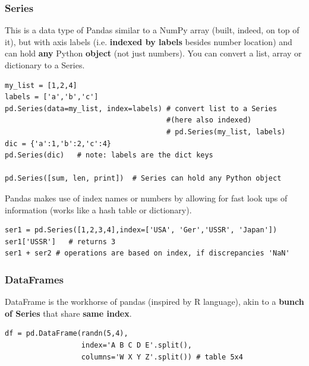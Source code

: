 \documentclass[11pt]{article}
\begin{document}
\subsubsection{Series}
This is a data type of Pandas similar to a NumPy array (built, indeed, on top of it), but with axis labels (i.e. \textbf{indexed by labels} besides number location) and can hold \textbf{any} Python \textbf{object} (not just numbers).
You can convert a list, array or dictionary to a Series. 
\begin{lstlisting}
my_list = [1,2,4]
labels = ['a','b','c']
pd.Series(data=my_list, index=labels) # convert list to a Series 
                                      #(here also indexed)
                                      # pd.Series(my_list, labels)   
dic = {'a':1,'b':2,'c':4}
pd.Series(dic)   # note: labels are the dict keys

pd.Series([sum, len, print])  # Series can hold any Python object
\end{lstlisting}

Pandas makes use of index names or numbers by allowing for fast look ups of information (works like a hash table or dictionary).
\begin{lstlisting}
ser1 = pd.Series([1,2,3,4],index=['USA', 'Ger','USSR', 'Japan'])     
ser1['USSR']   # returns 3
ser1 + ser2 # operations are based on index, if discrepancies 'NaN'
\end{lstlisting}

\subsubsection{DataFrames}
DataFrame is the workhorse of pandas (inspired by R language), akin to a \textbf{bunch of Series} that share \textbf{same index}.
\begin{lstlisting}
df = pd.DataFrame(randn(5,4), 
                  index='A B C D E'.split(), 
                  columns='W X Y Z'.split()) # table 5x4
\end{lstlisting}
\end{document}
